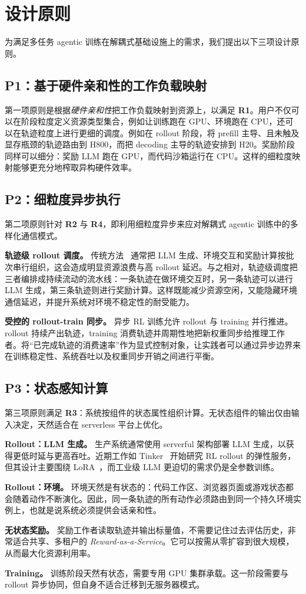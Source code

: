 \section{设计原则}
\label{sec:design-principle}
为满足多任务 agentic 训练在解耦式基础设施上的需求，我们提出以下三项设计原则。

\subsection{P1：基于硬件亲和性的工作负载映射}
第一项原则是根据\textit{硬件亲和性}把工作负载映射到资源上，以满足 \textbf{R1}。用户不仅可以在阶段粒度定义资源类型集合，例如让训练跑在 GPU、环境跑在 CPU，还可以在轨迹粒度上进行更细的调度。例如在 rollout 阶段，将 prefill 主导、且未触及显存瓶颈的轨迹路由到 H800，而把 decoding 主导的轨迹安排到 H20。奖励阶段同样可以细分：奖励 LLM 跑在 GPU，而代码沙箱运行在 CPU。这样的细粒度映射能够更充分地榨取异构硬件效率。

\subsection{P2：细粒度异步执行}
第二项原则针对 \textbf{R2} 与 \textbf{R4}，即利用细粒度异步来应对解耦式 agentic 训练中的多样化通信模式。

\noindent\textbf{轨迹级 rollout 调度。}
传统方法~\cite{verl} 通常把 LLM 生成、环境交互和奖励计算按批次串行组织，这会造成明显资源浪费与高 rollout 延迟。与之相对，轨迹级调度把三者编排成持续流动的流水线：一条轨迹在做环境交互时，另一条轨迹可以进行 LLM 生成，第三条轨迹则进行奖励计算。这样既能减少资源空闲，又能隐藏环境通信延迟，并提升系统对环境不稳定性的耐受能力。

\noindent\textbf{受控的 rollout-train 同步。}
异步 RL 训练允许 rollout 与 training 并行推进。rollout 持续产出轨迹，training 消费轨迹并周期性地把新权重同步给推理工作者。\SystemName{}将“已完成轨迹的消费速率”作为显式控制对象，让实践者可以通过异步边界来在训练稳定性、系统吞吐以及权重同步开销之间进行平衡。

\subsection{P3：状态感知计算}
第三项原则满足 \textbf{R3}：系统按组件的状态属性组织计算。无状态组件的输出仅由输入决定，天然适合在 serverless 平台上优化。

\noindent\textbf{Rollout：LLM 生成。}
生产系统通常使用 serverful 架构部署 LLM 生成，以获得更低时延与更高吞吐。近期工作如 Tinker~\cite{tml2025tinker} 开始研究 RL rollout 的弹性服务，但其设计主要围绕 LoRA~\cite{hu2021loralowrankadaptationlarge}，而工业级 LLM 更迫切的需求仍是全参数训练。

\noindent\textbf{Rollout：环境。}
环境天然是有状态的：代码工作区、浏览器页面或游戏状态都会随着动作不断演化。因此，同一条轨迹的所有动作必须路由到同一个持久环境实例上，也就是说系统必须提供会话亲和性。

\noindent\textbf{无状态奖励。}
奖励工作者读取轨迹并输出标量值，不需要记住过去评估历史，非常适合共享、多租户的 \textit{Reward-as-a-Service}。它可以按需从零扩容到很大规模，从而最大化资源利用率。

\noindent\textbf{Training。}
训练阶段天然有状态，需要专用 GPU 集群承载。这一阶段需要与 rollout 异步协同，但自身不适合迁移到无服务器模式。
